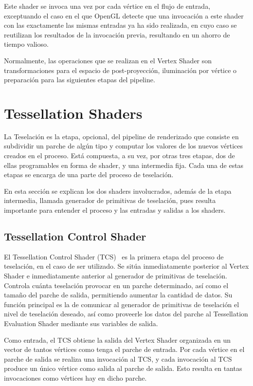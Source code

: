 Este shader se invoca una vez por cada vértice en el flujo de entrada,
exceptuando el caso en el que OpenGL detecte que una invocación a este shader
con las exactamente las mismas entradas ya ha sido realizada, en cuyo caso se
reutilizan los resultados de la invocación previa, resultando en un ahorro
de tiempo valioso. 

Normalmente, las operaciones que se realizan en el Vertex Shader son
transformaciones para el espacio de post-proyección, iluminación por vértice o
preparación para las siguientes etapas del pipeline. 

\section{Tessellation Shaders}
\label{ref:TesShaders}

La Teselación es la etapa, opcional, del pipeline de renderizado que consiste en
subdividir un parche de algún tipo y computar los valores de los nuevos vértices
creados en el proceso. Está compuesta, a su vez, por otras tres etapas, dos de
ellas programables en forma de shader, y una intermedia fija. Cada una de estas
etapas se encarga de una parte del proceso de teselación.

En esta sección se explican los dos shaders involucrados, además de la etapa
intermedia, llamada generador de primitivas de teselación, pues resulta
importante para entender el proceso y las entradas y salidas a los shaders.

\subsection{Tessellation Control Shader}
\label{ref:TesConShader}

El Tessellation Control Shader (TCS)~\cite{TesConShader} es la primera etapa del
proceso de teselación, en el caso de ser utilizado. Se sitúa inmediatamente
posterior al Vertex Shader e inmediatamente anterior al generador de primitivas
de teselación. Controla cuánta teselación provocar en un parche determinado, así
como el tamaño del parche de salida, permitiendo aumentar la cantidad de datos.
Su función principal es la de comunicar al generador de primitivas de teselación
el nivel de teselación deseado, así como proveerle los datos del parche al
Tessellation Evaluation Shader mediante sus variables de salida.

Como entrada, el TCS obtiene la salida del Vertex Shader organizada en un vector
de tantos vértices como tenga el parche de entrada. Por cada vértice en el
parche de salida se realiza una invocación al TCS, y cada invocación al TCS
produce un único vértice como salida al parche de salida. Esto resulta en tantas
invocaciones como vértices hay en dicho parche.

